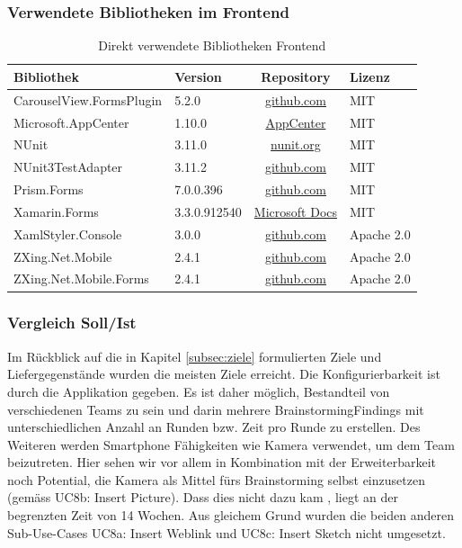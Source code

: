 \subsubsection{Verwendete Bibliotheken im Frontend}
\begin{table}[h]
	\centering
	\begin{tabular}{| l | l | c | l |}
		\hline
		\textbf{Bibliothek} & \textbf{Version} & \textbf{Repository} & \textbf{Lizenz}\\
		\hline
		CarouselView.FormsPlugin & 5.2.0 & \href{https://github.com/alexrainman/CarouselView}{github.com} & MIT \\
		Microsoft.AppCenter & 1.10.0 & \href{https://visualstudio.microsoft.com/app-center/}{AppCenter} & MIT \\
		NUnit & 3.11.0 & \href{http://nunit.org}{nunit.org} & MIT\\
		NUnit3TestAdapter & 3.11.2 & \href{https://github.com/nunit/docs/wiki/Visual-Studio-Test-Adapter}{github.com} & MIT\\
		Prism.Forms & 7.0.0.396 & \href{https://github.com/PrismLibrary/Prism}{github.com} & MIT \\
		Xamarin.Forms & 3.3.0.912540 & \href{https://docs.microsoft.com/en-us/xamarin/xamarin-forms/}{Microsoft Docs} & MIT \\
		XamlStyler.Console & 3.0.0 & 
		\href{https://github.com/Xavalon/XamlStyler}{github.com} & Apache 2.0\\
		ZXing.Net.Mobile & 2.4.1 & \href{http://github.com/Redth/ZXing.Net.Mobile}{github.com} & Apache 2.0\\
		ZXing.Net.Mobile.Forms & 2.4.1 &
		\href{http://github.com/Redth/ZXing.Net.Mobile}{github.com} & Apache 2.0\\
		\hline
	\end{tabular}
	\caption{Direkt verwendete Bibliotheken Frontend}
	\label{tab:verwendete-libraries-frontend}
\end{table}


\subsubsection{Vergleich Soll/Ist}\label{subsub:vergleich-soll-ist}
Im Rückblick auf die in Kapitel \ref{subsec:ziele} formulierten Ziele und Liefergegenstände wurden die meisten Ziele erreicht. Die Konfigurierbarkeit ist durch die Applikation gegeben. Es ist daher möglich, Bestandteil von verschiedenen Teams zu sein und darin mehrere BrainstormingFindings mit unterschiedlichen Anzahl an Runden bzw. Zeit pro Runde zu erstellen. Des Weiteren werden Smartphone Fähigkeiten wie Kamera verwendet, um dem Team beizutreten. Hier sehen wir vor allem in Kombination mit der Erweiterbarkeit noch Potential, die Kamera als Mittel fürs Brainstorming selbst einzusetzen (gemäss UC8b: Insert Picture). Dass dies nicht dazu kam , liegt an der begrenzten Zeit von 14 Wochen. Aus gleichem Grund wurden die beiden anderen Sub-Use-Cases UC8a: Insert Weblink und UC8c: Insert Sketch nicht umgesetzt.

